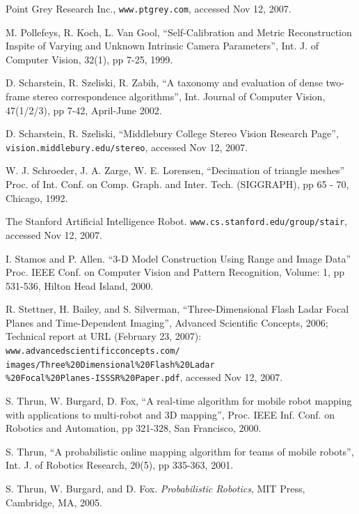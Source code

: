 \documentclass[twocolumn,oneside]{book}
\begin{document}
\begin{thebibliography}{99}
Point Grey Research Inc.,
\verb+www.ptgrey.com+, accessed Nov 12, 2007.

M. Pollefeys, R. Koch, L. Van Gool,
``Self-Calibration and Metric Reconstruction Inspite of Varying and Unknown Intrinsic Camera Parameters'',
Int. J. of Computer Vision, 32(1), pp 7-25, 1999.

D. Scharstein, R. Szeliski, R. Zabih,
``A taxonomy and evaluation of dense two-frame stereo correspondence algorithms'',
Int. Journal of Computer Vision, 47(1/2/3), pp 7-42, April-June 2002.

D. Scharstein, R. Szeliski,
``Middlebury College Stereo Vision Research Page'',
\verb+vision.middlebury.edu/stereo+, accessed Nov 12, 2007.

W. J. Schroeder, J. A. Zarge, W. E. Lorensen,
``Decimation of triangle meshes''
Proc.  of Int. Conf. on Comp. Graph. and Inter. Tech. (SIGGRAPH), pp 65 - 70, Chicago, 1992.

The Stanford Artificial Intelligence Robot.
\verb+www.cs.stanford.edu/group/stair+, accessed Nov 12, 2007.


I. Stamos and P. Allen.
``3-D Model Construction Using Range and Image Data''
Proc. IEEE Conf. on Computer Vision and Pattern Recognition, 
Volume: 1,  pp 531-536, Hilton Head Island, 2000. 

R. Stettner, H. Bailey, and S. Silverman,
``Three-Dimensional Flash Ladar Focal Planes and Time-Dependent Imaging'',
Advanced Scientific Concepts, 2006;
Technical report at URL (February 23, 2007):
\verb+www.advancedscientificconcepts.com/+\\
\verb+images/Three%20Dimensional%20Flash%20Ladar+\\
\verb+%20Focal%20Planes-ISSSR%20Paper.pdf+, accessed Nov 12, 2007.

S. Thrun, W. Burgard, D. Fox,
``A real-time algorithm for mobile robot mapping with applications to
multi-robot and 3D mapping'',  
Proc. IEEE Inf. Conf. on Robotics and Automation, pp 321-328, San Francisco, 2000.

S. Thrun, 
``A probabilistic online mapping algorithm for teams of mobile robots'',
Int. J. of Robotics Research, 20(5), pp 335-363, 2001.

S. Thrun, W. Burgard, and D. Fox. 
{\em Probabilistic Robotics}, MIT Press, Cambridge, MA, 2005.


\end{thebibliography}
\end{document}
